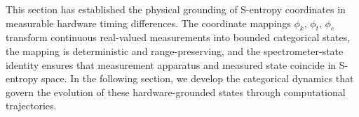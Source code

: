This section has established the physical grounding of S-entropy coordinates in measurable hardware timing differences. The coordinate mappings $\phi_k$, $\phi_t$, $\phi_e$ transform continuous real-valued measurements into bounded categorical states, the mapping is deterministic and range-preserving, and the spectrometer-state identity ensures that measurement apparatus and measured state coincide in S-entropy space. In the following section, we develop the categorical dynamics that govern the evolution of these hardware-grounded states through computational trajectories.
